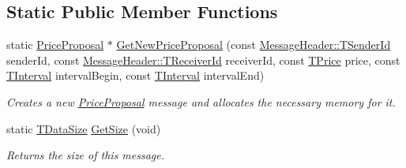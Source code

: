 \subsection*{Static Public Member Functions}
\begin{DoxyCompactItemize}
\item 
static \hyperlink{class_terra_swarm_1_1_synchronous_1_1_price_proposal}{Price\-Proposal} $\ast$ \hyperlink{class_terra_swarm_1_1_synchronous_1_1_price_proposal_a6936d20aa34398a5f32a78b98e9af1d1}{Get\-New\-Price\-Proposal} (const \hyperlink{class_terra_swarm_1_1_message_header_a516b36855e2aad7cfbf8770f1b42784f}{Message\-Header\-::\-T\-Sender\-Id} sender\-Id, const \hyperlink{class_terra_swarm_1_1_message_header_aa3260702b182b6f88ddbdd3416e98df0}{Message\-Header\-::\-T\-Receiver\-Id} receiver\-Id, const \hyperlink{class_terra_swarm_1_1_synchronous_1_1_price_proposal_a663093d390a30942a07eee3681ff8fe2}{T\-Price} price, const \hyperlink{class_terra_swarm_1_1_synchronous_1_1_price_proposal_a37e6344d030c7695bb9cb341648928ee}{T\-Interval} interval\-Begin, const \hyperlink{class_terra_swarm_1_1_synchronous_1_1_price_proposal_a37e6344d030c7695bb9cb341648928ee}{T\-Interval} interval\-End)
\begin{DoxyCompactList}\small\item\em Creates a new \hyperlink{class_terra_swarm_1_1_synchronous_1_1_price_proposal}{Price\-Proposal} message and allocates the necessary memory for it. \end{DoxyCompactList}\item 
static \hyperlink{namespace_terra_swarm_a092e6ec9739175076ae3106783f5c1b6}{T\-Data\-Size} \hyperlink{class_terra_swarm_1_1_synchronous_1_1_price_proposal_abbb9ecb920cda08184eed9225600f47e}{Get\-Size} (void)
\begin{DoxyCompactList}\small\item\em Returns the size of this message. \end{DoxyCompactList}\end{DoxyCompactItemize}
